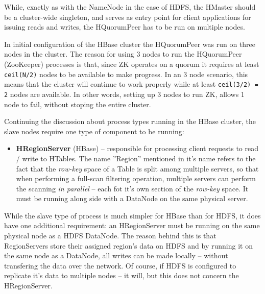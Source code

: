 While, exactly as with the NameNode in the case of HDFS, the HMaster should be a cluster-wide singleton, and serves as entry point for client applications for issuing reads and writes, the HQuorumPeer has to be run on multiple nodes. 

In initial configuration of the HBase cluster the HQuorumPeer was run on three nodes in the cluster. The reason for using 3 nodes to run the HQuorumPeer (ZooKeeper) processes is that, since ZK operates on a quorum it requires at least \verb|ceil(N/2)| nodes to be available to make progress. In an 3 node scenario, this means that the cluster will continue to work properly while at least \verb|ceil(3/2) = 2| nodes are available. In other words, setting up 3 nodes to run ZK, allows 1 node to fail, without stoping the entire cluster.

Continuing the discussion about process types running in the HBase cluster, the slave nodes require one type of component to be running:

\begin{itemize}
\item \textbf{HRegionServer} (HBase) -- responsible for processing client requests to read / write to HTables.
                                        The name ''Region'' mentioned in it's name refers to the fact that the 
                                        \textit{row-key} space of a Table is split among multiple servers, so that when
                                        performing a full-scan filtering operation, multiple servers can perform the
                                        scanning \textit{in parallel} -- each fot it's own section of the
                                        \textit{row-key} space. It must be running along side with a DataNode on the
                                        same physical server.
                                        
\end{itemize}

While the slave type of process is much simpler for HBase than for HDFS, it does have one additional requirement: an HRegionServer must be running on the same physical node as a HDFS DataNode. The reason behind this is that RegionServers store their assigned region's data on HDFS and by running it on the same node as a DataNode, all writes can be made locally -- without transfering the data over the network. Of course, if HDFS is configured to replicate it's data to multiple nodes -- it will, but this does not concern the HRegionServer.


